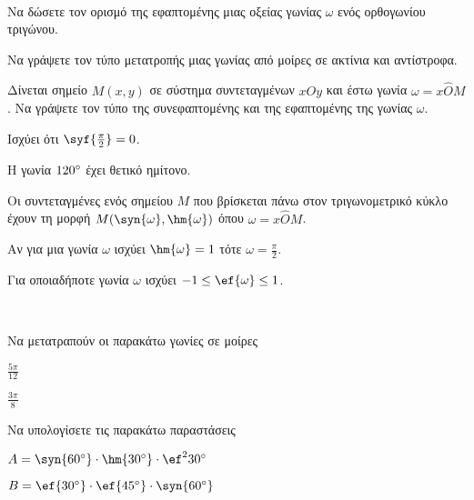 \documentclass[twoside,nofonts,ektypwsh]{frontisthrio-diag}
\begin{document}
\begin{thema}
\item\mbox{}\\\vspace{-7mm}
\begin{erwthma}
\item Να δώσετε τον ορισμό της εφαπτομένης μιας οξείας γωνίας $ \omega $ ενός ορθογωνίου τριγώνου.
\item Να γράψετε τον τύπο μετατροπής μιας γωνίας από μοίρες σε ακτίνια και αντίστροφα.
\item Δίνεται σημείο $ M(x,y) $ σε σύστημα συντεταγμένων $ xOy $ και έστω γωνία $ \omega=x\hat{O}M $. Να γράψετε τον τύπο της συνεφαπτομένης και της εφαπτομένης της γωνίας $ \omega $.
\item \swstolathospan
\begin{alist}
\item Ισχύει ότι $ \syf{\frac{\pi}{2}}=0 $.
\item Η γωνία $ 120\degree $ έχει θετικό ημίτονο.
\item Οι συντεταγμένες ενός σημείου $ M $ που βρίσκεται πάνω στον τριγωνομετρικό κύκλο έχουν τη μορφή $ M(\syn{\omega},\hm{\omega}) $ όπου $ \omega=x\hat{O}M $.
\item Αν για μια γωνία $ \omega $ ισχύει $ \hm{\omega}=1 $ τότε $ \omega=\frac{\pi}{2} $.
\item Για οποιαδήποτε γωνία $ \omega $ ισχύει $ -1\leq\ef{\omega}\leq 1 $.
\end{alist}
\end{erwthma}
\item\mbox{}\\\vspace{-7mm}
\begin{erwthma}
\item Να μετατραπούν οι παρακάτω γωνίες σε μοίρες
\begin{multicols}{2}
\begin{alist}
\item $ \frac{5\pi}{12} $
\item $ \frac{3\pi}{8} $
\end{alist}
\end{multicols}
\item Να υπολογίσετε τις παρακάτω παραστάσεις
\begin{alist}
\item $ A=\syn{60\degree}\cdot\hm{30\degree}\cdot\ef^2{30\degree} $
\item $ B=\ef{30\degree}\cdot\ef{45\degree}\cdot\syn{60\degree} $

\end{alist}
\end{erwthma}
\end{thema}
\end{document}
